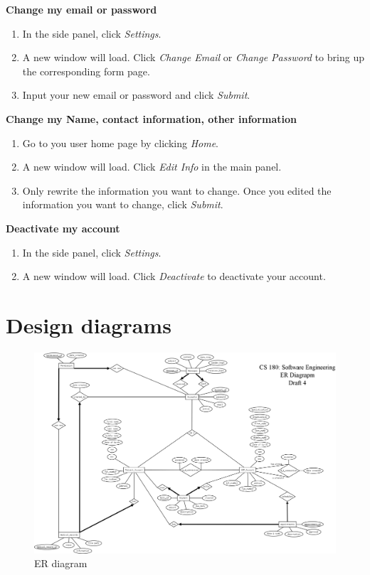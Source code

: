 \documentclass[10pt]{report}
\begin{document}
\textbf{Change my email or password}
\begin{enumerate}
\item In the side panel, click \textit{Settings}.
\item A new window will load. Click \textit{Change Email} or \textit{Change Password} to bring up the corresponding form page.
\item Input your new email or password and click \textit{Submit}.
\end{enumerate}
\textbf{Change my Name, contact information, other information}
\begin{enumerate}
\item Go to you user home page by clicking \textit{Home}.
\item A new window will load. Click \textit{Edit Info} in the main panel.
\item Only rewrite the information you want to change. Once you edited the information you want to change, click \textit{Submit}.
\end{enumerate}
\textbf{Deactivate my account}
\begin{enumerate}
\item In the side panel, click \textit{Settings}.
\item A new window will load. Click \textit{Deactivate} to deactivate your account.
\end{enumerate}



\appendix
\chapter{Design diagrams}
\label{app:diagrams}

\begin{figure}
\centering
\includegraphics[scale=0.29, angle=90]{Diagram1.png}
\caption{ER diagram}
\label{fig:erdiagram}
\end{figure}
\end{document}
